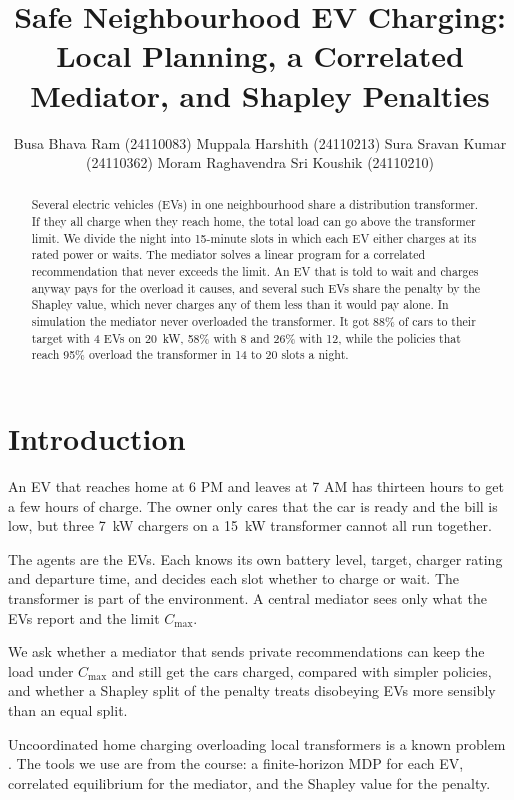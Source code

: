 \documentclass{article}
\title{Safe Neighbourhood EV Charging: Local Planning, a Correlated Mediator, and Shapley Penalties}
\author{
  Busa Bhava Ram (24110083) \And Muppala Harshith (24110213) \AND
  Sura Sravan Kumar (24110362) \And Moram Raghavendra Sri Koushik (24110210)
}
\newcommand{\cmax}{C_{\max}}
\begin{document}
\maketitle

\begin{abstract}
Several electric vehicles (EVs) in one neighbourhood share a distribution transformer. If they all charge when they reach home, the total load can go above the transformer limit. We divide the night into 15-minute slots in which each EV either charges at its rated power or waits. The mediator solves a linear program for a correlated recommendation that never exceeds the limit. An EV that is told to wait and charges anyway pays for the overload it causes, and several such EVs share the penalty by the Shapley value, which never charges any of them less than it would pay alone. In simulation the mediator never overloaded the transformer. It got 88\% of cars to their target with 4 EVs on 20~kW, 58\% with 8 and 26\% with 12, while the policies that reach 95\% overload the transformer in 14 to 20 slots a night.
\end{abstract}


\section{Introduction}

An EV that reaches home at 6 PM and leaves at 7 AM has thirteen hours to get a few hours of charge. The owner only cares that the car is ready and the bill is low, but three 7~kW chargers on a 15~kW transformer cannot all run together.

The agents are the EVs. Each knows its own battery level, target, charger rating and departure time, and decides each slot whether to charge or wait. The transformer is part of the environment. A central mediator sees only what the EVs report and the limit $\cmax$.

We ask whether a mediator that sends private recommendations can keep the load under $\cmax$ and still get the cars charged, compared with simpler policies, and whether a Shapley split of the penalty treats disobeying EVs more sensibly than an equal split.

Uncoordinated home charging overloading local transformers is a known problem \cite{shojaei2023}. The tools we use are from the course: a finite-horizon MDP for each EV, correlated equilibrium \cite{aumann1974} for the mediator, and the Shapley value \cite{shapley1953} for the penalty.
\end{document}
